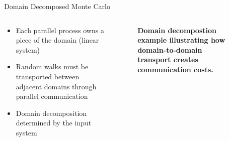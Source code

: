 \documentclass{beamer}
\begin{document}
\begin{frame}{Domain Decomposed Monte Carlo}

  \begin{columns}
    \begin{column}{0.5\textwidth}
      \begin{itemize}
      \item Each parallel process owns a piece of the domain (linear
        system)
        \bigskip
      \item Random walks must be transported between adjacent domains
        through parallel communication
        \bigskip
      \item Domain decomposition determined by the input system
      \end{itemize}
    \end{column}

    \begin{column}{0.5\textwidth}
      \begin{figure}[htpb!]
        \begin{center}
          \scalebox{0.75}{  }
        \end{center}
        \caption{\textbf{Domain decompostion example illustrating how
            domain-to-domain transport creates communication costs.}}
      \end{figure}
    \end{column}
  \end{columns}

\end{frame}
\end{document}
